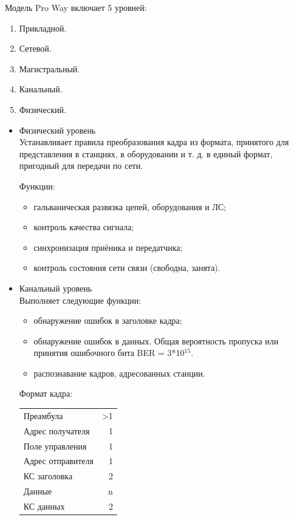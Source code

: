 \documentclass[12pt, russian, oneside, article]{ncc}
\begin{document}
Модель Pro Way включает 5 уровней:
\begin{enumerate}
\item Прикладной.
\item Сетевой.
\item Магистральный.
\item Канальный.
\item Физический.
\end{enumerate}
\begin{itemize}

\item Физический уровень\\
\label{sec-5_2_3_1}%
Устанавливает правила преобразования кадра из формата, принятого для представления в станциях, в оборудовании и т. д. в единый формат, пригодный для передачи по сети.

Функции:
\begin{itemize}
\item гальваническая развязка цепей, оборудования и ЛС;
\item контроль качества сигнала;
\item синхронизация приёника и передатчика;
\item контроль состояния сети связи (свободна, занята).
\end{itemize}


\item Канальный уровень\\
\label{sec-5_2_3_2}%
Выполняет следующие функции:
\begin{itemize}
\item обнаружение ошибок в заголовке кадра;
\item обнаружение ошибок в данных. Общая вероятность пропуска или принятия ошибочного бита BER = 3*10$^{\mathrm{15}}$.
\item распознавание кадров, адресованных станции.
\end{itemize}

Формат кадра:

\begin{center}
\begin{tabular}{lr}
 Преамбула          &  >1  \\
 Адрес получателя   &   1  \\
 Поле управления    &   1  \\
 Адрес отправителя  &   1  \\
 КС заголовка       &   2  \\
 Данные             &   n  \\
 КС данных          &   2  \\
\end{tabular}
\end{center}




\end{itemize}
\end{document}
